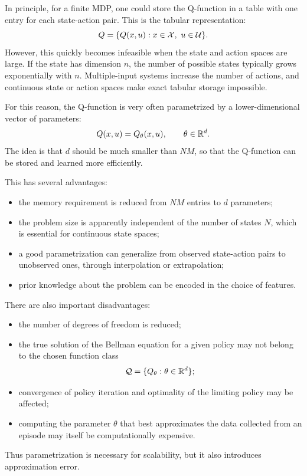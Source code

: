 In principle, for a finite MDP, one could store the Q-function in a table with one entry for each
state-action pair. This is the tabular representation:
\[
Q
=
\{Q(x,u):x\in\mathcal{X},\ u\in\mathcal{U}\}.
\]
However, this quickly becomes infeasible when the state and action spaces are large. If the state
has dimension \(n\), the number of possible states typically grows exponentially with \(n\).
Multiple-input systems increase the number of actions, and continuous state or action spaces
make exact tabular storage impossible.

For this reason, the Q-function is very often parametrized by a lower-dimensional vector of
parameters:
\[
Q(x,u)=Q_\theta(x,u),
\qquad
\theta\in\mathbb{R}^d.
\]
The idea is that \(d\) should be much smaller than \(NM\), so that the Q-function can be stored
and learned more efficiently.

This has several advantages:
\begin{itemize}
    \item the memory requirement is reduced from \(NM\) entries to \(d\) parameters;
    \item the problem size is apparently independent of the number of states \(N\), which is
    essential for continuous state spaces;
    \item a good parametrization can generalize from observed state-action pairs to unobserved
    ones, through interpolation or extrapolation;
    \item prior knowledge about the problem can be encoded in the choice of features.
\end{itemize}

There are also important disadvantages:
\begin{itemize}
    \item the number of degrees of freedom is reduced;
    \item the true solution of the Bellman equation for a given policy may not belong to the
    chosen function class
    \[
    \mathcal{Q}
    =
    \{Q_\theta:\theta\in\mathbb{R}^d\};
    \]
    \item convergence of policy iteration and optimality of the limiting policy may be affected;
    \item computing the parameter \(\theta\) that best approximates the data collected from an
    episode may itself be computationally expensive.
\end{itemize}

Thus parametrization is necessary for scalability, but it also introduces approximation error.

